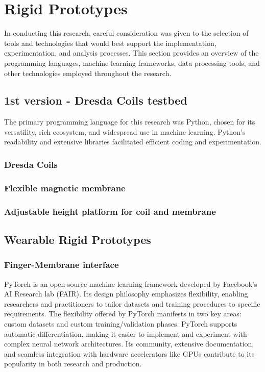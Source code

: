 \section{Rigid Prototypes}
In conducting this research, careful consideration was given to the selection of tools and technologies that would best support the implementation, experimentation, and analysis processes. This section provides an overview of the programming languages, machine learning frameworks, data processing tools, and other technologies employed throughout the research.

\subsection{1st version - Dresda Coils testbed}
The primary programming language for this research was Python, chosen for its versatility, rich ecosystem, and widespread use in machine learning. Python's readability and extensive libraries facilitated efficient coding and experimentation.

\subsubsection{Dresda Coils}
\subsubsection{Flexible magnetic membrane}
\subsubsection{Adjustable height platform for coil and membrane}

\subsection{Wearable Rigid Prototypes}

\subsubsection{Finger-Membrane interface}


PyTorch is an open-source machine learning framework developed by Facebook's AI Research lab (FAIR). Its design philosophy emphasizes flexibility, enabling researchers and practitioners to tailor datasets and training procedures to specific requirements. The flexibility offered by PyTorch manifests in two key areas: custom datasets and custom training/validation phases. PyTorch supports automatic differentiation, making it easier to implement and experiment with complex neural network architectures. Its community, extensive documentation, and seamless integration with hardware accelerators like GPUs contribute to its popularity in both research and production.

